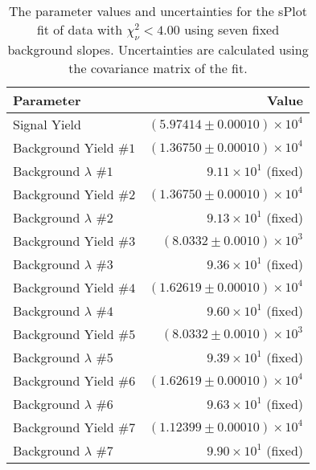
\begin{table}[ht]
    \begin{center}
        \begin{tabular}{lr}\toprule
            Parameter & Value \\\midrule
            Signal Yield & $(5.97414 \pm 0.00010) \times 10^{4}$ \\
            Background Yield $\#1$ & $(1.36750 \pm 0.00010) \times 10^{4}$ \\
            Background $\lambda$ $\#1$ & $9.11 \times 10^{1}$ (fixed) \\
            Background Yield $\#2$ & $(1.36750 \pm 0.00010) \times 10^{4}$ \\
            Background $\lambda$ $\#2$ & $9.13 \times 10^{1}$ (fixed) \\
            Background Yield $\#3$ & $(8.0332 \pm 0.0010) \times 10^{3}$ \\
            Background $\lambda$ $\#3$ & $9.36 \times 10^{1}$ (fixed) \\
            Background Yield $\#4$ & $(1.62619 \pm 0.00010) \times 10^{4}$ \\
            Background $\lambda$ $\#4$ & $9.60 \times 10^{1}$ (fixed) \\
            Background Yield $\#5$ & $(8.0332 \pm 0.0010) \times 10^{3}$ \\
            Background $\lambda$ $\#5$ & $9.39 \times 10^{1}$ (fixed) \\
            Background Yield $\#6$ & $(1.62619 \pm 0.00010) \times 10^{4}$ \\
            Background $\lambda$ $\#6$ & $9.63 \times 10^{1}$ (fixed) \\
            Background Yield $\#7$ & $(1.12399 \pm 0.00010) \times 10^{4}$ \\
            Background $\lambda$ $\#7$ & $9.90 \times 10^{1}$ (fixed) \\\bottomrule
        \end{tabular}
        \caption{The parameter values and uncertainties for the sPlot fit of data with $\chi^2_\nu < 4.00$ using seven fixed background slopes. Uncertainties are calculated using the covariance matrix of the fit.}\label{tab:splot-fit-results-chisqdof-4.00-fixed-7}
    \end{center}
\end{table}
